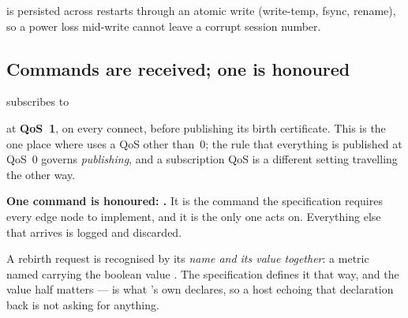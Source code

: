  is persisted across restarts through an atomic write (write-temp, fsync,
rename), so a power loss mid-write cannot leave a corrupt session number.

\subsection{Commands are received; one is honoured}
\label{sec:contract-ncmd}

\prog subscribes to

\begin{center}\end{center}

\noindent at \textbf{QoS~1}, on every connect, before publishing its birth certificate.
This is the one place where \prog uses a QoS other than~0; the rule that everything is
published at QoS~0 governs \emph{publishing}, and a subscription QoS is a different setting
travelling the other way.

\textbf{One command is honoured: .} It is the command the
specification requires every edge node to implement, and it is the only one \prog acts on.
Everything else that arrives is logged and discarded.

A rebirth request is recognised by its \emph{name and its value together}: a metric named
 carrying the boolean value . The specification
defines it that way, and the value half matters ---  is what \prog's own
 declares, so a host echoing that declaration back is not asking for anything.

